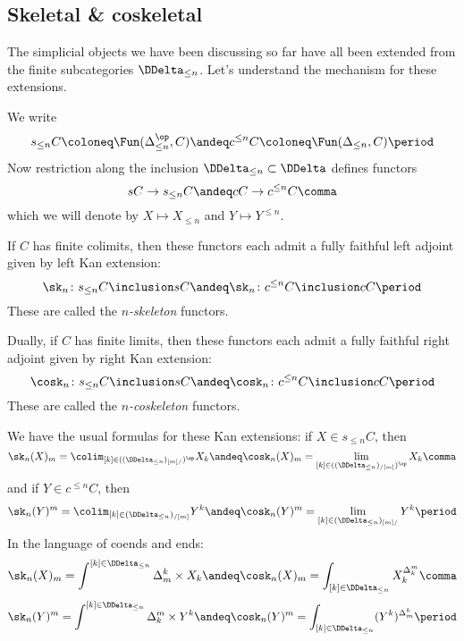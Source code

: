 
\subsection{Skeletal \& coskeletal}%
\label{sub:skeletalandcoskeletal}

The simplicial objects we have been discussing so far have all been extended from the finite subcategories $\DDelta_{\leq n}$.
Let's understand the mechanism for these extensions.

We write
\[
  s_{\leq n}C \coloneq \Fun(\Delta_{\leq n}^{\op}, C)
  \andeq
  c^{\leq n}C \coloneq \Fun(\Delta_{\leq n}, C)
  \period
\]
Now restriction along the inclusion $\DDelta_{\leq n} \subset \DDelta$ defines functors
\[
  sC \to s_{\leq n}C
  \andeq
  cC \to c^{\leq n}C \comma
\]
which we will denote by $X \mapsto X_{\leq n}$ and $Y \mapsto Y^{\leq n}$.

\begin{definition}
  If $C$ has finite colimits, then these functors each admit a fully faithful left adjoint given by left Kan extension:
  \[
    \sk_n \colon s_{\leq n}C \inclusion sC
    \andeq
    \sk_n \colon c^{\leq n}C \inclusion cC \period
  \]
  These are called the \emph{$n$-skeleton} functors.
  
  Dually, if $C$ has finite limits, then these functors each admit a fully faithful right adjoint given by right Kan extension:
  \[
    \cosk_n \colon s_{\leq n}C \inclusion sC
    \andeq
    \cosk_n \colon c^{\leq n}C \inclusion cC \period
  \]
  These are called the \emph{$n$-coskeleton} functors.
\end{definition}

We have the usual formulas for these Kan extensions:
if $X \in s_{\leq n}C$, then
\[
  \sk_n(X)_m = \colim_{[k] \in ((\DDelta_{\leq n})_{[m]/})^{\op}} X_k 
  \andeq
  \cosk_n(X)_m = \lim_{[k] \in ((\DDelta_{\leq n})_{/[m]})^{\op}} X_k \comma
\]
and if $Y \in c^{\leq n}C$, then
\[
  \sk_n(Y)^m = \colim_{[k] \in (\DDelta_{\leq n})_{/[m]}} Y^k 
  \andeq
  \cosk_n(Y)^m = \lim_{[k] \in (\DDelta_{\leq n})_{[m]/}} Y^k \period
\]
In the language of coends and ends:
\[
  \sk_n(X)_m = \int^{[k] \in \DDelta_{\leq n}} \Delta^k_m \times X_k
  \andeq
  \cosk_n(X)_m = \int_{[k] \in \DDelta_{\leq n}} X_k^{\Delta^m_k} \comma
\]
\[
  \sk_n(Y)^m = \int^{[k] \in \DDelta_{\leq n}} \Delta^m_k \times Y^k
  \andeq
  \cosk_n(Y)^m = \int_{[k] \in \DDelta_{\leq n}} (Y^k)^{\Delta^k_m} \period
\]

